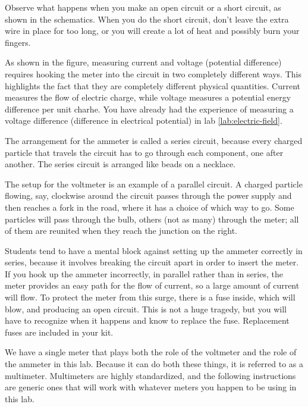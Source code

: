 
Observe what happens when you make an open circuit or a short circuit, as shown
in the schematics. When you do the short circuit, don't leave the extra wire in
place for too long, or you will create a lot of heat and possibly burn your fingers.




As shown in the figure, measuring current and voltage (potential difference) requires
hooking the meter into the circuit in two completely different
ways. This highlights the fact that they are completely different
physical quantities. Current measures the flow of electric charge,
while voltage measures a potential energy difference per unit charhe.
You have already had the experience of measuring a voltage difference
(difference in electrical potential) in lab \ref{lab:electric-field}.


The arrangement for the ammeter is called a series circuit,
because every charged particle that travels the circuit has
to go through each component, one after another.
The series circuit is arranged like beads on a necklace.

The setup for the voltmeter is an example of a parallel
circuit. A charged particle flowing, say, clockwise
around the circuit passes through the power supply and
then reaches a fork in the road, where it has a choice
of which way to go. Some particles will pass through the
bulb, others (not as many) through the meter; all of them
are reunited when they reach the junction on the right.

Students tend to have a mental block against setting up the
ammeter correctly in series, because it involves breaking the circuit
apart in order to insert the meter.  If you hook up the ammeter incorrectly,
in parallel rather than in series, the meter provides an easy path for the flow
of current, so a large amount of current will flow. To protect the meter
from this surge, there is a fuse inside, which will blow, and producing
an open circuit. This is not a huge tragedy, but you will have to recognize
when it happens and know to replace the fuse. Replacement fuses are included
in your kit.

We have a single meter that plays both the role of the voltmeter
and the role of the ammeter in this lab. Because it can do both
these things, it is referred to as a multimeter. Multimeters are
highly standardized, and the following instructions are generic
ones that will work with whatever meters you happen to be using
in this lab.

